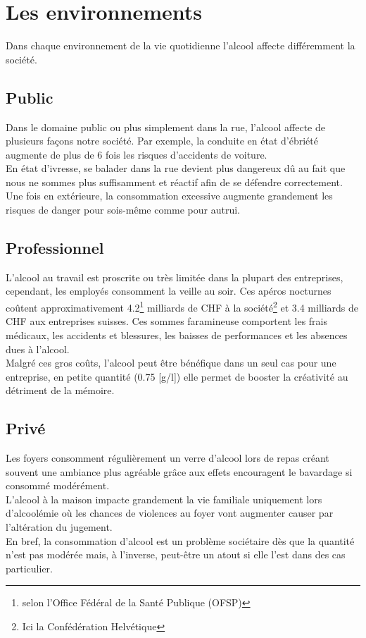 \documentclass[a4paper, french, 12pt]{extarticle}
\begin{document}
	\section{Les environnements}
	Dans chaque environnement de la vie quotidienne l'alcool affecte différemment la société.
	\subsection{Public}
	Dans le domaine public ou plus simplement dans la rue, l'alcool affecte de plusieurs façons notre société. Par exemple, la conduite en état d'ébriété augmente de plus de 6 fois les risques d'accidents de voiture.\\
	En état d'ivresse, se balader dans la rue devient plus dangereux dû au fait que nous ne sommes plus suffisamment et réactif afin de se défendre correctement.\\
	Une fois en extérieure, la consommation excessive augmente grandement les risques de danger pour sois-même comme pour autrui.
	\subsection{Professionnel}
	L'alcool au travail est proscrite ou très limitée dans la plupart des entreprises, cependant, les employés consomment la veille au soir. Ces apéros nocturnes coûtent approximativement 4.2\footnote{selon l'Office Fédéral de la Santé Publique (OFSP)} milliards de CHF à la société\footnote{Ici la Confédération Helvétique} et 3.4 milliards de CHF aux entreprises suisses. Ces sommes faramineuse comportent les frais médicaux, les accidents et blessures, les baisses de performances et les absences dues à l'alcool.\\
	Malgré ces gros coûts, l'alcool peut être bénéfique dans un seul cas pour une entreprise, en petite quantité (0.75 [g/l]) elle permet de booster la créativité au détriment de la mémoire.
	\subsection{Privé}
	Les foyers consomment régulièrement un verre d'alcool lors de repas créant  souvent une ambiance plus agréable grâce aux effets encouragent le bavardage si consommé modérément.\\
	L'alcool à la maison impacte grandement la vie familiale uniquement lors d'alcoolémie où les chances de violences au foyer vont augmenter causer par l'altération du jugement.\\
	En bref, la consommation d'alcool est un problème sociétaire dès que la quantité n'est pas modérée mais, à l'inverse, peut-être un atout si elle l'est dans des cas particulier.
\end{document}
